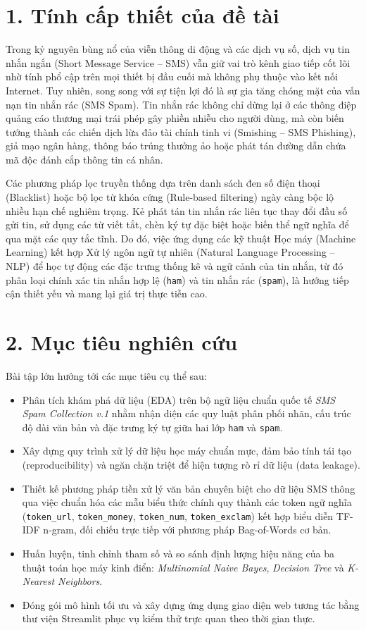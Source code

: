 \documentclass[12pt,a4paper]{report}
\begin{document}
\section*{1. Tính cấp thiết của đề tài}
Trong kỷ nguyên bùng nổ của viễn thông di động và các dịch vụ số, dịch vụ tin nhắn ngắn (Short Message Service -- SMS) vẫn giữ vai trò kênh giao tiếp cốt lõi nhờ tính phổ cập trên mọi thiết bị đầu cuối mà không phụ thuộc vào kết nối Internet. Tuy nhiên, song song với sự tiện lợi đó là sự gia tăng chóng mặt của vấn nạn tin nhắn rác (SMS Spam). Tin nhắn rác không chỉ dừng lại ở các thông điệp quảng cáo thương mại trái phép gây phiền nhiễu cho người dùng, mà còn biến tướng thành các chiến dịch lừa đảo tài chính tinh vi (Smishing -- SMS Phishing), giả mạo ngân hàng, thông báo trúng thưởng ảo hoặc phát tán đường dẫn chứa mã độc đánh cắp thông tin cá nhân.

Các phương pháp lọc truyền thống dựa trên danh sách đen số điện thoại (Blacklist) hoặc bộ lọc từ khóa cứng (Rule-based filtering) ngày càng bộc lộ nhiều hạn chế nghiêm trọng. Kẻ phát tán tin nhắn rác liên tục thay đổi đầu số gửi tin, sử dụng các từ viết tắt, chèn ký tự đặc biệt hoặc biến thể ngữ nghĩa để qua mặt các quy tắc tĩnh. Do đó, việc ứng dụng các kỹ thuật Học máy (Machine Learning) kết hợp Xử lý ngôn ngữ tự nhiên (Natural Language Processing -- NLP) để học tự động các đặc trưng thống kê và ngữ cảnh của tin nhắn, từ đó phân loại chính xác tin nhắn hợp lệ (\texttt{ham}) và tin nhắn rác (\texttt{spam}), là hướng tiếp cận thiết yếu và mang lại giá trị thực tiễn cao.

\section*{2. Mục tiêu nghiên cứu}
Bài tập lớn hướng tới các mục tiêu cụ thể sau:
\begin{itemize}
    \item Phân tích khám phá dữ liệu (EDA) trên bộ ngữ liệu chuẩn quốc tế \textit{SMS Spam Collection v.1} nhằm nhận diện các quy luật phân phối nhãn, cấu trúc độ dài văn bản và đặc trưng ký tự giữa hai lớp \texttt{ham} và \texttt{spam}.
    \item Xây dựng quy trình xử lý dữ liệu học máy chuẩn mực, đảm bảo tính tái tạo (reproducibility) và ngăn chặn triệt để hiện tượng rò rỉ dữ liệu (data leakage).
    \item Thiết kế phương pháp tiền xử lý văn bản chuyên biệt cho dữ liệu SMS thông qua việc chuẩn hóa các mẫu biểu thức chính quy thành các token ngữ nghĩa (\texttt{token\_url}, \texttt{token\_money}, \texttt{token\_num}, \texttt{token\_exclam}) kết hợp biểu diễn TF-IDF n-gram, đối chiếu trực tiếp với phương pháp Bag-of-Words cơ bản.
    \item Huấn luyện, tinh chỉnh tham số và so sánh định lượng hiệu năng của ba thuật toán học máy kinh điển: \textit{Multinomial Naive Bayes}, \textit{Decision Tree} và \textit{K-Nearest Neighbors}.
    \item Đóng gói mô hình tối ưu và xây dựng ứng dụng giao diện web tương tác bằng thư viện Streamlit phục vụ kiểm thử trực quan theo thời gian thực.
\end{itemize}
\end{document}
